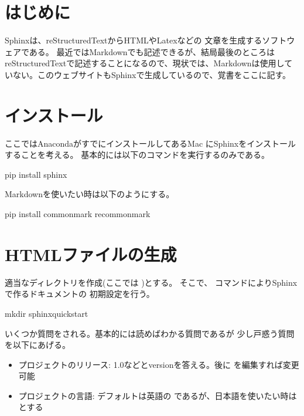\documentclass[letterpaper,10pt,dvipdfmx,report]{sphinxmanual}
\begin{document}
\section{はじめに}
\label{\detokenize{sphinx:id1}}
Sphinxは、reStructuredTextからHTMLやLatexなどの
文章を生成するソフトウェアである。
最近ではMarkdownでも記述できるが、結局最後のところはreStructuredTextで記述することになるので、現状では、Markdownは使用していない。このウェブサイトもSphinxで生成しているので、覚書をここに記す。


\section{インストール}
\label{\detokenize{sphinx:id3}}
ここではAnacondaがすでにインストールしてあるMac
にSphinxをインストールすることを考える。
基本的には以下のコマンドを実行するのみである。

\begin{sphinxVerbatim}[commandchars=\\\{\}]
pip install sphinx
\end{sphinxVerbatim}

Markdownを使いたい時は以下のようにする。

\begin{sphinxVerbatim}[commandchars=\\\{\}]
pip install commonmark recommonmark
\end{sphinxVerbatim}


\section{HTMLファイルの生成}
\label{\detokenize{sphinx:html}}
適当なディレクトリを作成(ここでは  )とする。
そこで、  コマンドによりSphinxで作るドキュメントの
初期設定を行う。

\begin{sphinxVerbatim}[commandchars=\\\{\}]
mkdir  
     
sphinx\PYGZhy{}quickstart
\end{sphinxVerbatim}

いくつか質問をされる。基本的には読めばわかる質問であるが
少し戸惑う質問を以下にあげる。
\begin{itemize}
\item {} 
プロジェクトのリリース: 1.0などとversionを答える。後に  を編集すれば変更可能

\item {} 
プロジェクトの言語: デフォルトは英語の  であるが、日本語を使いたい時は  とする

\end{itemize}
\end{document}

